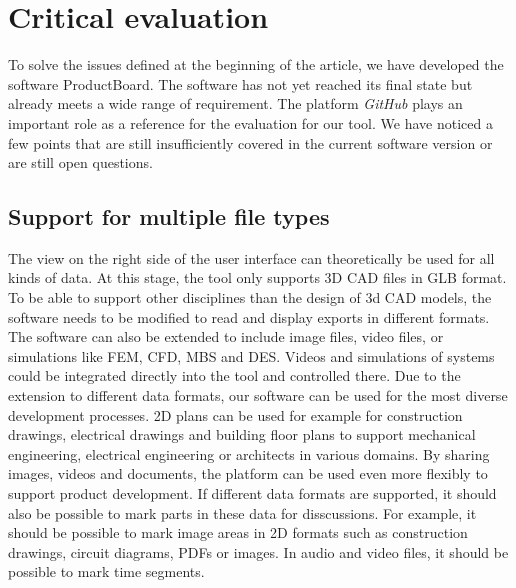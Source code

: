 \section{Critical evaluation}
\label{sec:evaluation}
To solve the issues defined at the beginning of the article, we have developed the software ProductBoard. The software has not yet reached its final state but already meets a wide range of requirement. The platform \textit{GitHub} plays an important role as a reference for the evaluation for our tool.
We have noticed a few points that are still insufficiently covered in the current software version or are still open questions.

\subsection*{Support for multiple file types}
The view on the right side of the user interface can theoretically be used for all kinds of data.
At this stage, the tool only supports 3D CAD files in GLB format. To be able to support other disciplines than the design of 3d CAD models, the software needs to be modified to read and display exports in different formats. The software can also be extended to include image files, video files, or simulations like FEM, CFD, MBS and DES. Videos and simulations of systems could be integrated directly into the tool and controlled there.
Due to the extension to different data formats, our software can be used for the most diverse development processes. 
2D plans can be used for example for construction drawings, electrical drawings and building floor plans to support mechanical engineering, electrical engineering or architects in various domains.
By sharing images, videos and documents, the platform can be used even more flexibly to support product development.
If different data formats are supported, it should also be possible to mark parts in these data for disscussions.
For example, it should be possible to mark image areas in 2D formats such as construction drawings, circuit diagrams, PDFs or images. 
In audio and video files, it should be possible to mark time segments.


